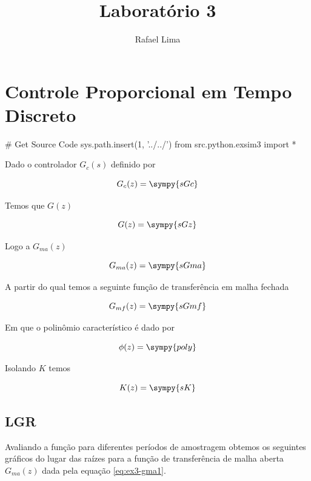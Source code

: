 \documentclass[a4paper,11pt]{article}
\title{Laboratório 3} %
\author{Rafael Lima}
\begin{document}

\section{Controle Proporcional em Tempo Discreto}

\begin{sympycode}
# Get Source Code
sys.path.insert(1, '../../')
from src.python.exsim3 import *
\end{sympycode}

Dado o controlador $G_c(s)$ definido por

\begin{equation}
    G_c(z) = \sympy{sGc}
\end{equation}

Temos que $G(z)$

\begin{equation}
    G(z) = \sympy{sGz}
\end{equation}

Logo a $G_{ma}(z)$

\begin{equation}\label{eq:ex3-gma1}
    G_{ma}(z) = \sympy{sGma}
\end{equation}

A partir do qual temos a seguinte função de transferência em malha fechada

\begin{equation}
    G_{mf}(z) = \sympy{sGmf}
\end{equation}

Em que o polinômio característico é dado por

\begin{equation}
    \phi(z) = \sympy{poly}
\end{equation}

Isolando $K$ temos

\begin{equation}\label{eq:ex3-k-poly}
    K(z) = \sympy{sK}
\end{equation}

\subsection{LGR}

Avaliando a função para diferentes períodos de amostragem obtemos os seguintes gráficos do lugar das raízes para a função de transferência de malha aberta $G_{ma}(z)$ dada pela equação \ref{eq:ex3-gma1}.
\end{document}
